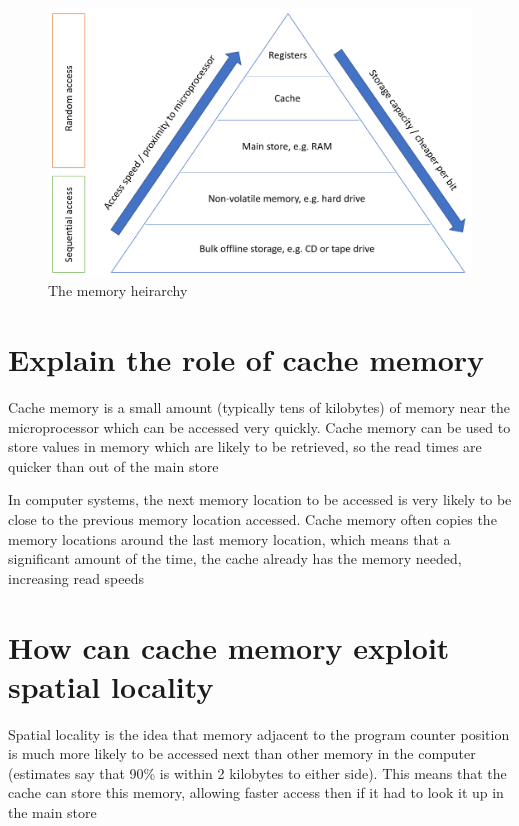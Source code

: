 \documentclass{article}
\begin{document}
\begin{figure}
\centering
\includegraphics[width=\textwidth]{./memoryHeirarchy.png}
\caption{The memory heirarchy}
\end{figure}


\section{Explain the role of cache memory}

Cache memory is a small amount (typically tens of kilobytes) of memory near the
microprocessor which can be accessed very quickly. Cache memory can be used to
store values in memory which are likely to be retrieved, so the read times are
quicker than out of the main store

In computer systems, the next memory location to be accessed is very likely to
be close to the previous memory location accessed. Cache memory often copies the
memory locations around the last memory location, which means that a significant
amount of the time, the cache already has the memory needed, increasing read
speeds


\section{How can cache memory exploit spatial locality}

Spatial locality is the idea that memory adjacent to the program counter
position is much more likely to be accessed next than other memory in the
computer (estimates say that 90\% is within 2 kilobytes to either side). This
means that the cache can store this memory, allowing faster access then if it
had to look it up in the main store
\end{document}
